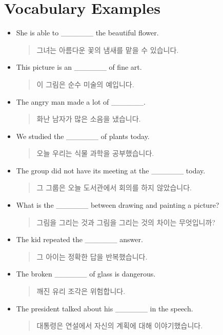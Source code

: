 \documentclass{article}
\begin{document}
\section*{Vocabulary Examples}
\begin{addmargin}[1em]{1em}
\begin{itemize}
    \item She is able to \_\_\_\_\_\_ the beautiful flower.
    \begin{quote}
    그녀는 아름다운 꽃의 냄새를 맡을 수 있습니다.
    \end{quote}
    \item This picture is an \_\_\_\_\_\_ of fine art.
    \begin{quote}
    이 그림은 순수 미술의 예입니다.
    \end{quote}
    \item The angry man made a lot of \_\_\_\_\_\_.
    \begin{quote}
    화난 남자가 많은 소음을 냈습니다.
    \end{quote}
    \item We studied the \_\_\_\_\_\_ of plants today.
    \begin{quote}
    오늘 우리는 식물 과학을 공부했습니다.
    \end{quote}
    \item The group did not have its meeting at the \_\_\_\_\_\_ today.
    \begin{quote}
    그 그룹은 오늘 도서관에서 회의를 하지 않았습니다.
    \end{quote}
    \item What is the \_\_\_\_\_\_ between drawing and painting a picture?
    \begin{quote}
    그림을 그리는 것과 그림을 그리는 것의 차이는 무엇입니까?
    \end{quote}
    \item The kid repeated the \_\_\_\_\_\_ answer.
    \begin{quote}
    그 아이는 정확한 답을 반복했습니다.
    \end{quote}
    \item The broken \_\_\_\_\_\_ of glass is dangerous.
    \begin{quote}
    깨진 유리 조각은 위험합니다.
    \end{quote}
    \item The president talked about his \_\_\_\_\_\_ in the speech.
    \begin{quote}
    대통령은 연설에서 자신의 계획에 대해 이야기했습니다.

\end{quote}
\end{itemize}
\end{addmargin}
\end{document}
